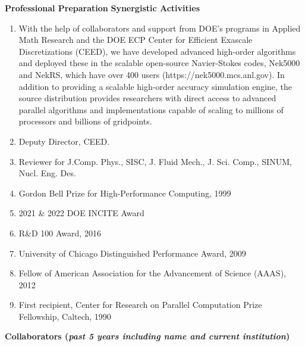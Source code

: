 \documentclass[11pt,letterpaper,english]{article}
\begin{document}
\begin{flushleft} {\bf Professional Preparation}
\vspace{.04in}
{\bf Synergistic Activities}
\vspace{-6pt}
\begin{enumerate} \itemsep1pt \parskip0pt 
%
 \item With the help of collaborators and support from DOE's programs in
Applied Math Research and the DOE ECP Center for Efficient Exascale
Discretizations (CEED), we have developed advanced high-order algorithms and
deployed these in the scalable open-source Navier-Stokes codes, Nek5000 and
NekRS, which have over 400 users (https://nek5000.mcs.anl.gov). In addition to
providing a scalable high-order accuracy simulation engine, the source
distribution provides researchers with direct access to advanced parallel
algorithms and implementations capable of scaling to millions of processors and
billions of gridpoints. \\
%
\item Deputy Director, CEED.
%
\item Reviewer for J.Comp. Phys., SISC, J. Fluid Mech., J. Sci. Comp., SINUM, Nucl. Eng. Des. \\
%
 \item Gordon Bell Prize for High-Performance Computing, 1999
%
 \item 2021 \& 2022 DOE INCITE Award
%
 \item R\&D 100 Award, 2016
%
 \item University of Chicago Distinguished Performance Award, 2009
%
 \item Fellow of American Association for the Advancement of Science (AAAS), 2012
%
 \item First recipient, Center for Research on Parallel Computation Prize Fellowship, Caltech, 1990
\end{enumerate}

\vspace{-6pt}
{\bf Collaborators ({\emph{past 5 years including name and current institution}})}
{\parindent 16pt


}
\end{flushleft}
\end{document}
